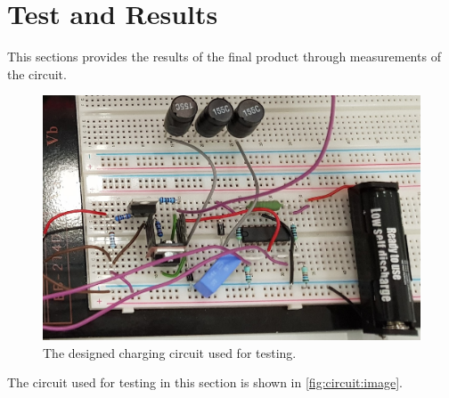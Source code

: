 \documentclass[../report.tex]{subfiles}
\begin{document}
\section{Test and Results} \label{sec:results}
This sections provides the results of the final product through measurements of the circuit.
\begin{figure}[H]
    \centering
         \includegraphics[width=1\textwidth]{figures/circuit/combined_triple_zoom.jpg}
     \caption{The designed charging circuit used for testing.}
     \label{fig:circuit:image}
\end{figure}
The circuit used for testing in this section is shown in \autoref{fig:circuit:image}.
\end{document}
